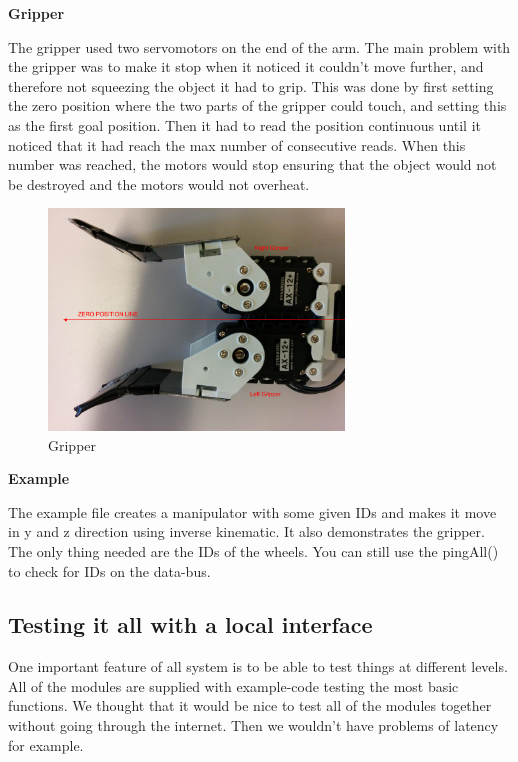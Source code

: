 \textbf{Gripper}

The gripper used two servomotors on the end of the arm. The main problem with the gripper was to make it stop when it noticed it couldn't move further, and therefore not squeezing the object it had to grip. This was done by first setting the zero position where the two parts of the gripper could touch, and setting this as the first goal position. Then it had to read the position continuous until it noticed that it had reach the max number of consecutive reads. When this number was reached, the motors would stop ensuring that the object would not be destroyed and the motors would not overheat.

\begin{figure}[H]
    \centering
    \includegraphics[width=0.7\textwidth]{graphics/Gripper.png}
    \caption{Gripper}
    \label{fig:gripper} 
\end{figure}

\bigskip

\textbf{Example}

The example file creates a manipulator with some given IDs and makes it move in y and z direction using inverse kinematic. It also demonstrates the gripper. The only thing needed are the IDs of the wheels. You can still use the pingAll() to check for IDs on the data-bus.

\subsection{Testing it all with a local interface}

One important feature of all system is to be able to test things at different levels. All of the modules are supplied with example-code testing the most basic functions. We thought that it would be nice to test all of the modules together without going through the internet. Then we wouldn't have problems of latency for example. 

